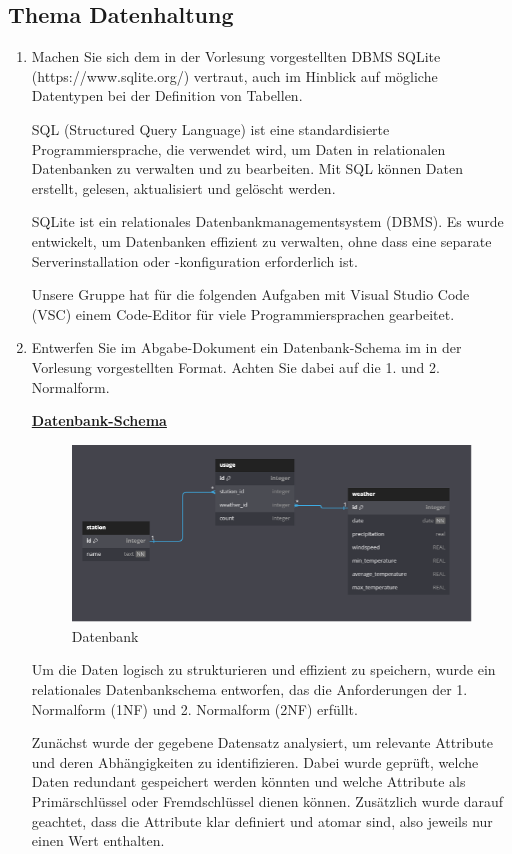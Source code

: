 \documentclass{article}
\begin{document}
\subsection{Thema Datenhaltung}
\begin{enumerate}
\item Machen Sie sich dem in der Vorlesung vorgestellten DBMS SQLite (https://www.sqlite.org/) vertraut, auch im Hinblick auf mögliche Datentypen bei der Definition von Tabellen.

 SQL (Structured Query Language) ist eine standardisierte Programmiersprache, die verwendet wird, um Daten in relationalen Datenbanken zu verwalten und zu bearbeiten. Mit SQL können Daten erstellt, gelesen, aktualisiert und gelöscht werden.

 SQLite ist ein relationales Datenbankmanagementsystem (DBMS). Es wurde entwickelt, um Datenbanken effizient zu verwalten, ohne dass eine separate Serverinstallation oder -konfiguration erforderlich ist. 

 Unsere Gruppe hat für die folgenden Aufgaben mit Visual Studio Code (VSC) einem Code-Editor für viele Programmiersprachen gearbeitet.

\newpage
\item Entwerfen Sie im Abgabe-Dokument ein Datenbank-Schema im in der Vorlesung vorgestellten Format. Achten Sie dabei auf die 1. und 2. Normalform.

\underline{\textbf{Datenbank-Schema}}
\begin{figure}[h]
    \centering
    \includegraphics[width=0.7\linewidth]{Datenbank-Schema.png}
    \caption{Datenbank}
    \label{fig:enter-label}
\end{figure}


Um die Daten logisch zu strukturieren und effizient zu speichern, wurde ein relationales Datenbankschema entworfen, das die Anforderungen der 1. Normalform (1NF) und 2. Normalform (2NF) erfüllt.

Zunächst wurde der gegebene Datensatz analysiert, um relevante Attribute und deren Abhängigkeiten zu identifizieren. Dabei wurde geprüft, welche Daten redundant gespeichert werden könnten und welche Attribute als Primärschlüssel oder Fremdschlüssel dienen können. Zusätzlich wurde darauf geachtet, dass die Attribute klar definiert und atomar sind, also jeweils nur einen Wert enthalten.
    

\end{enumerate}
\end{document}
